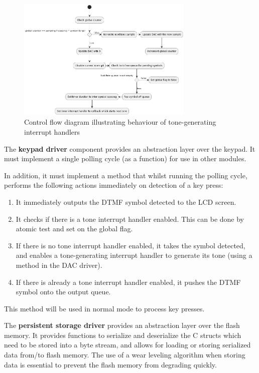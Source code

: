 \documentclass[11pt,a4paper
]{scrartcl}
\begin{document}
\begin{figure}
   \centering
   \includegraphics[width=0.75\textwidth]{tone_interrupt_cfd}
   \caption{Control flow diagram illustrating behaviour of tone-generating interrupt handlers}
   \label{fig:tone_interrupt_cfd}
\end{figure}

The \textbf{keypad driver} component provides an abstraction layer over the keypad. It must implement a single polling cycle (as a function) for use in other modules.

In addition, it must implement a method that whilst running the polling cycle, performs the following actions immediately on detection of a key press:
\begin{enumerate}
   \item It immediately outputs the DTMF symbol detected to the LCD screen.
   \item It checks if there is a tone interrupt handler enabled. This can be done by atomic test and set on the global flag.
   \item If there is no tone interrupt handler enabled, it takes the symbol detected, and enables a tone-generating interrupt handler to generate its tone 
      (using a method in the DAC driver).
   \item If there is already a tone interrupt handler enabled, it pushes the DTMF symbol onto the output queue.
\end{enumerate}
This method will be used in normal mode to process key presses.

The \textbf{persistent storage driver} provides an abstraction layer over the flash memory. It provides functions to serialize and deserialize the C structs 
which need to be stored into a byte stream, and allows for loading or storing serialized data from/to flash memory. The use of a wear leveling algorithm when storing data
is essential to prevent the flash memory from degrading quickly\cite{silberschatz2018operating}.
\end{document}

